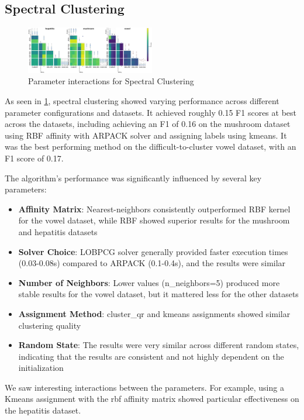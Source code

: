 \subsection{Spectral Clustering}
\label{subsec:spectralclusteringresults}

\begin{figure}[ht!]
    \includegraphics[width=0.5\textwidth]{figures/interactions_spectral_clustering.png}
    \caption{Parameter interactions for Spectral Clustering}
    \label{fig:interactions_spectral}
\end{figure}

As seen in \ref{fig:interactions_spectral}, spectral clustering showed varying performance across different parameter configurations and datasets. It achieved roughly 0.15 F1 scores at best across the datasets, including achieving an F1 of 0.16 on the mushroom dataset using RBF affinity with ARPACK solver and assigning labels using kmeans. It was the best performing method on the difficult-to-cluster vowel dataset, with an F1 score of 0.17.

The algorithm's performance was significantly influenced by several key parameters:

\begin{itemize}
    \item \textbf{Affinity Matrix}: Nearest-neighbors consistently outperformed RBF kernel for the vowel dataset, while RBF showed superior results for the mushroom and hepatitis datasets
    \item \textbf{Solver Choice}: LOBPCG solver generally provided faster execution times (0.03-0.08s) compared to ARPACK (0.1-0.4s), and the results were similar
    \item \textbf{Number of Neighbors}: Lower values (n\_neighbors=5) produced more stable results for the vowel dataset, but it mattered less for the other datasets
    \item \textbf{Assignment Method}: cluster\_qr and kmeans assignments showed similar clustering quality
    \item \textbf{Random State}: The results were very similar across different random states, indicating that the results are consistent and not highly dependent on the initialization
\end{itemize}

We saw interesting interactions between the parameters. For example, using a Kmeans assignment with the rbf affinity matrix showed particular effectiveness on the hepatitis dataset.
